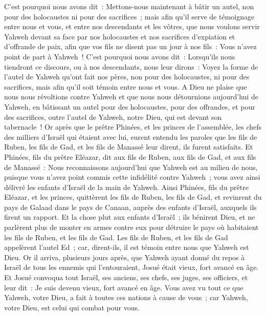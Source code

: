 \begin{multicols}{2}
C'est pourquoi nous avons dit~: Mettons-nous maintenant à bâtir un autel, non pour des holocaustes ni pour des sacrifices~;
mais afin qu'il serve de témoignage entre nous et vous, et entre nos descendants et les vôtres, que nous voulons servir Yahweh devant sa face par nos holocaustes et nos sacrifices d'expiation et d'offrande de paix, afin que vos fils ne disent pas un jour à nos fils~: Vous n'avez point de part à Yahweh~!
C'est pourquoi nous avons dit~: Lorsqu'ils nous tiendront ce discours, ou à nos descendants, nous leur dirons~: Voyez la forme de l'autel de Yahweh qu'ont fait nos pères, non pour des holocaustes, ni pour des sacrifices, mais afin qu'il soit témoin entre nous et vous.
A Dieu ne plaise que nous nous révoltions contre Yahweh et que nous nous détournions aujourd'hui de Yahweh, en bâtissant un autel pour des holocaustes, pour des offrandes, et pour des sacrifices, outre l'autel de Yahweh, notre Dieu, qui est devant son tabernacle~!
Or après que le prêtre Phinées, et les princes de l'assemblée, les chefs des milliers d'Israël qui étaient avec lui, eurent entendu les paroles que les fils de Ruben, les fils de Gad, et les fils de Manassé leur dirent, ils furent satisfaits.
Et Phinées, fils du prêtre Eléazar, dit aux fils de Ruben, aux fils de Gad, et aux fils de Manassé~: Nous reconnaissons aujourd'hui que Yahweh est au milieu de nous, puisque vous n'avez point commis cette infidélité contre Yahweh~; vous avez ainsi délivré les enfants d'Israël de la main de Yahweh.
Ainsi Phinées, fils du prêtre Eléazar, et les princes, quittèrent les fils de Ruben, les fils de Gad, et revinrent du pays de Galaad dans le pays de Canaan, auprès des enfants d'Israël, auxquels ils firent un rapport.
Et la chose plut aux enfants d'Israël~; ils bénirent Dieu, et ne parlèrent plus de monter en armes contre eux pour détruire le pays où habitaient les fils de Ruben, et les fils de Gad.
Les fils de Ruben, et les fils de Gad appelèrent l'autel Ed~; car, dirent-ils, il est témoin entre nous que Yahweh est Dieu.
\VerseOne{}Or il arriva, plusieurs jours après, que Yahweh ayant donné du repos à Israël de tous les ennemis qui l'entouraient, Josué était vieux, fort avancé en âge.
Et Josué convoqua tout Israël, ses anciens, ses chefs, ses juges, ses officiers, et leur dit~: Je suis devenu vieux, fort avancé en âge.
Vous avez vu tout ce que Yahweh, votre Dieu, a fait à toutes ces nations à cause de vous~; car Yahweh, votre Dieu, est celui qui combat pour vous.

\end{multicols}
